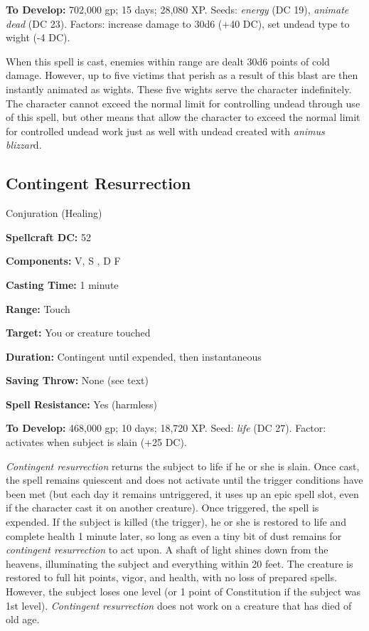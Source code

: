 \documentclass{article}
\begin{document}
\textbf{To Develop:} 702,000 gp; 15 days; 28,080 XP. Seeds: \textit{energy }(DC 
19), \textit{animate dead }(DC 23). Factors: increase damage to 30d6 (+40 DC), 
set undead type to wight (-4 DC). 

When this spell is cast, enemies within range are dealt 30d6 points of cold damage. 
However, up to five victims that perish as a result of this blast are then instantly 
animated as wights. These five wights serve the character indefinitely. The character 
cannot exceed the normal limit for controlling undead through use of this spell, 
but other means that allow the character to exceed the normal limit for controlled 
undead work just as well with undead created with \textit{animus blizzar}d. 

\vspace{12pt}
\subsection*{Contingent Resurrection }

Conjuration (Healing) 

\textbf{Spellcraft DC:} 52 

\textbf{Components:} V, S , D F

\textbf{Casting Time:} 1 minute 

\textbf{Range:} Touch 

\textbf{Target:} You or creature touched 

\textbf{Duration:} Contingent until expended, then instantaneous 

\textbf{Saving Throw:} None (see text) 

\textbf{Spell Resistance:} Yes (harmless) 

\textbf{To Develop:} 468,000 gp; 10 days; 18,720 XP. Seed: \textit{life }(DC 27). 
Factor: activates when subject is slain (+25 DC). 

\textit{Contingent resurrection }returns the subject to life if he or she is slain. 
Once cast, the spell remains quiescent and does not activate until the trigger 
conditions have been met (but each day it remains untriggered, it uses up an epic 
spell slot, even if the character cast it on another creature). Once triggered, 
the spell is expended. If the subject is killed (the trigger), he or she is restored 
to life and complete health 1 minute later, so long as even a tiny bit of dust 
remains for \textit{contingent resurrection }to act upon. A shaft of light shines 
down from the heavens, illuminating the subject and everything within 20 feet. 
The creature is restored to full hit points, vigor, and health, with no loss of 
prepared spells. However, the subject loses one level (or 1 point of Constitution 
if the subject was 1st level). \textit{Contingent resurrection }does not work on 
a creature that has died of old age. 
\end{document}
